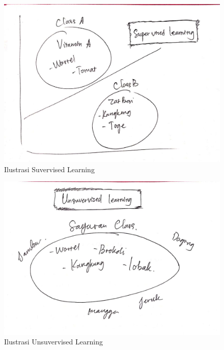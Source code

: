 \begin{figure}[ht]
      \centerline{\includegraphics[width=1\textwidth]
      {figures/c11}}
      \caption{Ilustrasi Suvervised Learning}
      \label{c11}
      \end{figure}

\begin{figure}[ht]
      \centerline{\includegraphics[width=1\textwidth]
      {figures/c12}}
      \caption{Ilustrasi Unsuvervised Learning}
      \label{c12}
      \end{figure}

